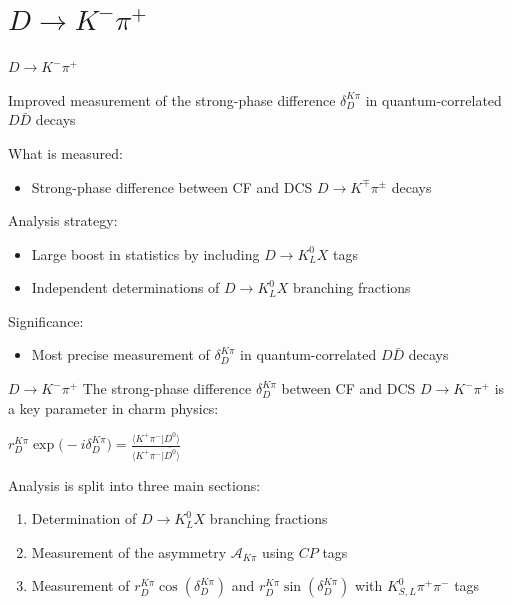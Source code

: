 \documentclass{beamer}
\begin{document}
\section{\texorpdfstring{$D\to K^-\pi^+$}{D2Kpi}}
\begin{frame}{$D\to K^-\pi^+$}
\begin{tcolorbox}[enhanced,frame style image=blueshade_cropped.png,
  opacityback=0.75,opacitybacktitle=0.25,
  colback=blue!5!white,colframe=blue!75!black,
  title=\color{white}{\href{https://link.springer.com/article/10.1140/epjc/s10052-022-10872-2}{\color{white}{EPJC \textbf{82} 1009 (2022)}}}]
  {\Large Improved measurement of the strong-phase difference $\delta_D^{K\pi}$ in quantum-correlated $D\bar{D}$ decays}
\end{tcolorbox}
  What is measured:
  \begin{itemize}
    \item{Strong-phase difference between CF and DCS $D\to K^\mp\pi^\pm$ decays}
  \end{itemize}
  Analysis strategy:
  \begin{itemize}
    \item{Large boost in statistics by including $D\to K_L^0X$ tags}
    \item{Independent determinations of $D\to K_L^0X$ branching fractions}
  \end{itemize}
  Significance:
  \begin{itemize}
    \item{Most precise measurement of $\delta_D^{K\pi}$ in quantum-correlated $D\bar{D}$ decays}
  \end{itemize}
\end{frame}

\begin{frame}{$D\to K^-\pi^+$}
  \vspace{0.0cm}
  {\large The strong-phase difference $\delta_D^{K\pi}$ between CF and DCS $D\to K^-\pi^+$ is a key parameter in charm physics:}
  \begin{center}
    $r_D^{K\pi}\exp\big(-i\delta_D^{K\pi}) = \frac{\langle K^+\pi^-\lvert D^0\rangle}{\langle K^+\pi^-\lvert \bar{D^0}\rangle}$
  \end{center}
  \vspace{0.5cm}
  {\large Analysis is split into three main sections:}
  \vspace{0.2cm}
  \begin{enumerate}
    \setlength{\itemsep}{1.0em}
    \item{Determination of $D\to K_L^0X$ branching fractions}
    \item{Measurement of the asymmetry $\mathcal{A}_{K\pi}$ using $C\!P$ tags}
    \item{Measurement of $r_D^{K\pi}\cos(\delta_D^{K\pi})$ and $r_D^{K\pi}\sin(\delta_D^{K\pi})$ with $K_{S, L}^0\pi^+\pi^-$ tags}
  \end{enumerate}
\end{frame}
\end{document}

